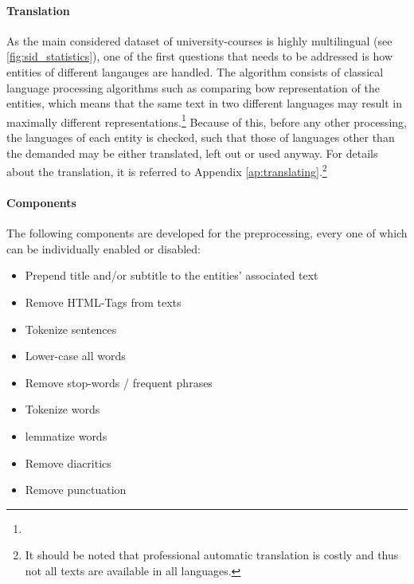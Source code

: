 \paragraph{Translation} As the main considered dataset of university-courses is highly multilingual (see \autoref{fig:sid_statistics}), one of the first questions that needs to be addressed is how entities of different langauges are handled. The algorithm consists of classical language processing algorithms such as comparing \gls{bow} representation of the entities, which means that the same text in two different languages may result in maximally different representations.\footnote{} Because of this, before any other processing, the languages of each entity is checked, such that those of languages other than the demanded may be either translated, left out or used anyway. For details about the translation, it is referred to Appendix \ref{ap:translating}.\footnote{It should be noted that professional automatic translation is costly and thus not all texts are available in all languages.}

\paragraph{Components} The following components are developed for the preprocessing, every one of which can be individually enabled or disabled:

\begin{itemize}
	\item Prepend title and/or subtitle to the entities' associated text 
	\item Remove HTML-Tags from texts 
	\item Tokenize sentences 
	\item Lower-case all words
	\item Remove stop-words / frequent phrases
	\item Tokenize words
	\item \Gls{lemma}tize words
	\item Remove diacritics
	\item Remove punctuation 
\end{itemize}


